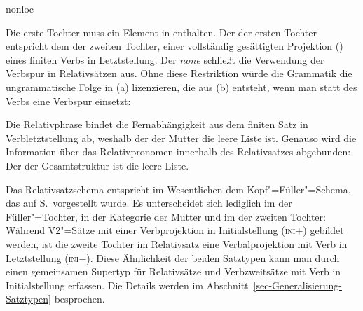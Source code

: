 \begin{samepage}
\begin{schema}
{{{                                                 nonloc  \\
                                               } 
                         } 
}%
\end{schema}
\end{samepage}
%
Die erste Tochter muss ein Element in \rel enthalten. Der \localw der ersten Tochter 
entspricht dem \slashw der zweiten Tochter, einer 
vollständig gesättigten Projektion (\comps \eliste) eines finiten Verbs in Letztstellung. Der \dslw
\emph{none} schließt die Verwendung der Verbspur in Relativsätzen aus. Ohne diese Restriktion würde
die Grammatik die ungrammatische Folge in (a) lizenzieren, die aus (b) entsteht, wenn
man statt des Verbs eine Verbspur einsetzt:
\eal
{}
\zl

\noindent
Die Relativphrase bindet die Fernabhängigkeit aus dem finiten Satz in Verbletztstellung ab,
weshalb der \slashw der Mutter die leere Liste ist. Genauso wird die Information über das
Relativpronomen innerhalb des Relativsatzes abgebunden: Der \relw der Gesamtstruktur ist die leere Liste. 
\largerpage

Das Relativsatzschema entspricht im Wesentlichen
dem Kopf"=Füller"=Schema, das auf S.\,\pageref{hf-schemaa} vorgestellt wurde. Es unterscheidet sich lediglich im
\relw der Füller"=Tochter, in der Kategorie der Mutter und im \iniw der zweiten Tochter: Während V2"=Sätze mit einer
Verbprojektion in Initialstellung (\textsc{ini}$+$) gebildet werden, ist die zweite Tochter im
Relativsatz eine Verbalprojektion mit Verb in Letztstellung (\textsc{ini}$-$). Diese Ähnlichkeit der
beiden Satztypen kann man durch einen gemeinsamen Supertyp für Relativsätze und Verbzweitsätze mit
Verb in Initialstellung erfassen. Die Details werden im
Abschnitt~\ref{sec-Generalisierung-Satztypen} besprochen.


